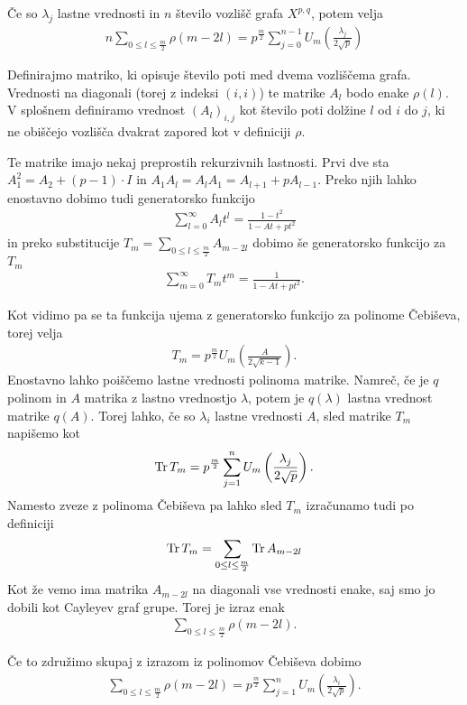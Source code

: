 \begin{izrek}
    Če so \(\lambda_j\) lastne vrednosti in \(n\) število vozlišč grafa \(X^{p,q}\), potem velja
    \begin{align*}
        n\sum_{0\leq l \leq \frac{m}{2}} \rho(m-2l) = p^{\frac{m}{2}}\sum_{j=0}^{n-1} U_m \left(\frac{\lambda_j}{2\sqrt{p}}\right)
    \end{align*}
\end{izrek}
\begin{dokaz}
    Definirajmo matriko, ki opisuje število poti med dvema vozliščema grafa. Vrednosti na diagonali (torej z indeksi \((i, i)\)) te matrike \(A_l\) bodo enake \(\rho(l)\). V splošnem definiramo vrednost \((A_l)_{i,j}\) kot število poti dolžine \(l\) od \(i\) do \(j\), ki ne obiščejo vozlišča dvakrat zapored kot v definiciji \(\rho\).

    Te matrike imajo nekaj preprostih rekurzivnih lastnosti. Prvi dve sta \(A_1^2 = A_2 + (p-1)\cdot I\) in \(A_1 A_l = A_lA_1 = A_{l+1}+pA_{l-1}\). Preko njih lahko enostavno dobimo tudi generatorsko funkcijo
    \begin{align*}
        \sum_{l=0}^\infty A_lt^l = \frac{1-t^2}{1-At+pt^2}
    \end{align*}
    in preko substitucije \(T_m = \sum_{0\leq l \leq \frac{m}{2}} A_{m-2l}\) dobimo še generatorsko funkcijo za \(T_m\)
    \begin{align*}
        \sum_{m=0}^\infty T_m t^m = \frac{1}{1-At+pt^2}.
    \end{align*}

    Kot vidimo pa se ta funkcija ujema z generatorsko funkcijo za polinome Čebiševa, torej velja
    \begin{align*}
        T_m = p^{\frac{m}{2}} U_m\left(\frac{A}{2\sqrt{k-1}}\right).
    \end{align*}
    Enostavno lahko poiščemo lastne vrednosti polinoma matrike. Namreč, če je \(q\) polinom in \(A\) matrika z lastno vrednostjo \(\lambda\), potem je \(q(\lambda)\) lastna vrednost matrike \(q(A)\). Torej lahko, če so \(\lambda_i\) lastne vrednosti \(A\), sled matrike \(T_m\) napišemo kot
    \begin{align*}
        \operatorname{Tr} T_m = p^{\frac{m}{2}}\sum_{j=1}^n U_m \left(\frac{\lambda_j}{2\sqrt{p}}\right).
    \end{align*}
    Namesto zveze z polinoma Čebiševa pa lahko sled \(T_m\) izračunamo tudi po definiciji
    \begin{align*}
        \operatorname{Tr} T_m = \sum_{0\leq l\leq \frac{m}{2}} \operatorname{Tr} A_{m-2l}
    \end{align*}
    Kot že vemo ima matrika \(A_{m-2l}\) na diagonali vse vrednosti enake, saj smo jo dobili kot Cayleyev graf grupe. Torej je izraz enak
    \begin{align*}
        \sum_{0\leq l\leq \frac{m}{2}} \rho(m-2l).
    \end{align*}

    Če to združimo skupaj z izrazom iz polinomov Čebiševa dobimo
    \begin{align*}
        \sum_{0\leq l\leq \frac{m}{2}} \rho(m-2l) = p^{\frac{m}{2}}\sum_{j=1}^n U_m \left(\frac{\lambda_i}{2\sqrt{p}}\right).
    \end{align*}
\end{dokaz}

